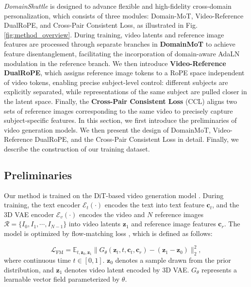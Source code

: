 \documentclass{llmxive}
\begin{document}
\textit{DomainShuttle} is designed to advance flexible and high-fidelity cross-domain personalization, which consists of three modules: Domain-MoT, Video-Reference DualRoPE, and Cross-Pair Consistent Loss, as illustrated in Fig. \ref{fig:method_overview}. During training,  video latents and reference image features are processed through separate branches in \textbf{DomainMoT} to achieve feature disentanglement, facilitating the incorporation of domain-aware AdaLN modulation in the reference branch. We then introduce \textbf{Video-Reference DualRoPE}, which assigns reference image tokens to a RoPE space independent of video tokens, enabling precise subject-level control: different subjects are explicitly separated, while representations of the same subject are pulled closer in the latent space. Finally, the \textbf{Cross-Pair Consistent Loss} (CCL) aligns two sets of reference images corresponding to the same video to precisely capture subject-specific features. In this section, we first introduce the preliminaries of video generation models. We then present the design of DomainMoT, Video-Reference  DualRoPE, and the Cross-Pair Consistent Loss in detail. Finally, we describe the construction of our training dataset.






\subsection{Preliminaries} 

Our method is trained on the DiT-based video generation model \cite{wan2025wan}. During training, the text encoder  $\boldsymbol{\mathcal{E}}_t(\cdot)$ \cite{chung2023unimax} encodes the text into text feature $\boldsymbol{c}_t$, and the 3D VAE encoder  $\boldsymbol{\mathcal{E}}_v(\cdot)$ encodes the video and $N$ reference images $\mathcal{R} = \{ I_0, I_1, \cdots, I_{N-1} \}$ into video latents $\boldsymbol{z}_1$ and reference image features $\boldsymbol{c}_r$. The model is optimized by flow-matching loss \cite{lipman2023flow}, which is defined as follows:

\begin{equation}
\mathcal{L}_{\mathrm{FM}}=\mathbb{E}_{t,\boldsymbol{z}_0,\boldsymbol{z}_1}\|{G}_\theta(\boldsymbol{z}_t,t,\boldsymbol{c}_t,\boldsymbol{c}_r)-(\boldsymbol{z}_1-\boldsymbol{z}_0)\|_2^2,
\label{eq:flow_matching_loss}
\end{equation}
where continuous time $t\in[0,1]$. $\boldsymbol{z}_0$ denotes a sample drawn from the prior distribution, and $\boldsymbol{z}_1$ denotes video latent encoded by 3D VAE. ${G}_\theta$ represents a learnable vector field parameterized by $\theta$.
\end{document}
